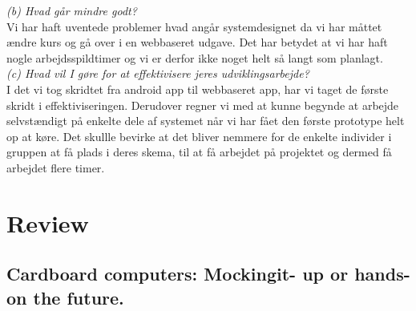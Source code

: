 \documentclass[12pt]{article}
\begin{document}
\textit{(b) Hvad går mindre godt?}\\

Vi har haft uventede problemer hvad angår systemdesignet da vi har måttet ændre kurs og gå over i en webbaseret udgave. Det har betydet at vi har haft nogle arbejdsspildtimer og vi er derfor ikke noget helt så langt som planlagt.\\

\textit{(c) Hvad vil I gøre for at effektivisere jeres udviklingsarbejde?}\\

I det vi tog skridtet fra android app til webbaseret app, har vi taget de første skridt i effektiviseringen. Derudover regner vi med at kunne begynde at arbejde selvstændigt på enkelte dele af systemet når vi har fået den første prototype helt op at køre. Det skullle bevirke at det bliver nemmere for de enkelte individer i gruppen at få plads i deres skema, til at få arbejdet på projektet og dermed få arbejdet flere timer. 

\pagebreak
\section{Review}
\subsection*{Cardboard computers: Mockingit- up or hands-on the future.}
\end{document}
